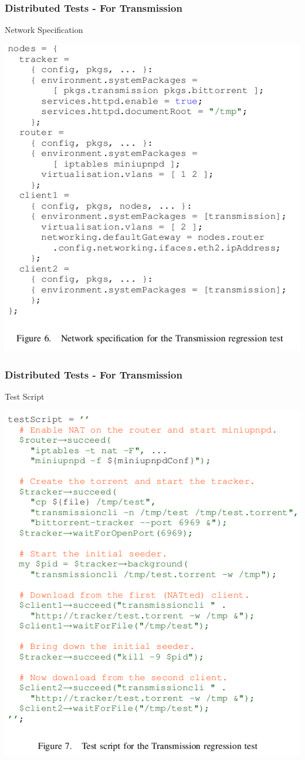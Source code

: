 \documentclass[compress,red]{beamer}
\begin{document}
\frame
{
	\frametitle{Distributed Tests - For Transmission}
	Network Specification 
	\begin{center}
	\includegraphics[scale=0.3]{vm-transmission-nix.png}
	\end{center}
}

\frame
{
	\frametitle{Distributed Tests - For Transmission}
	 Test Script 
	\begin{center}
	\includegraphics[scale=0.3]{vm-transmission-perl.png}
	\end{center}
}
\end{document}
